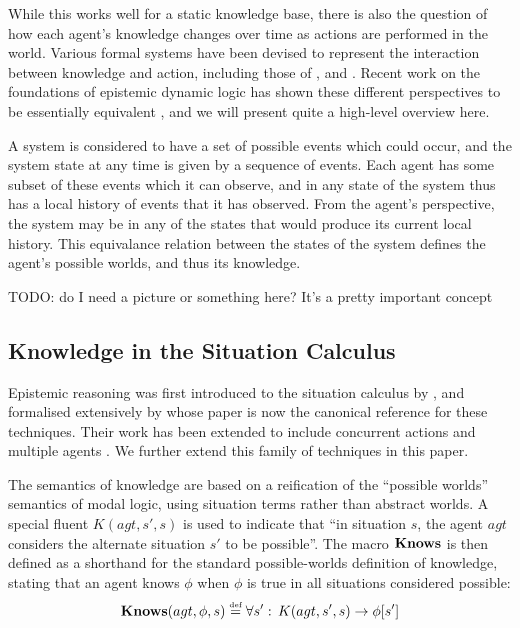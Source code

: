 While this works well for a static knowledge base, there is also the
question of how each agent's knowledge changes over time as actions
are performed in the world. Various formal systems have been devised
to represent the interaction between knowledge and action, including
those of \citet{fagin95}, \citet{parikh85dist_knowledge} and \citet{baltag98pa_ck}.
Recent work on the foundations of epistemic dynamic logic has shown
these different perspectives to be essentially equivalent \citep{vanBentham06tree_of_knowledge,pacuit07history_structures},
and we will present quite a high-level overview here.

A system is considered to have a set of possible events which could
occur, and the system state at any time is given by a sequence of
events. Each agent has some subset of these events which it can observe,
and in any state of the system thus has a local history of events
that it has observed. From the agent's perspective, the system may
be in any of the states that would produce its current local history.
This equivalance relation between the states of the system defines
the agent's possible worlds, and thus its knowledge.

TODO: do I need a picture or something here? It's a pretty important
concept


\subsection{Knowledge in the Situation Calculus}

Epistemic reasoning was first introduced to the situation calculus
by \citet{moore80know_act}, and formalised extensively by \citet{scherl03sc_knowledge}
whose paper is now the canonical reference for these techniques. Their
work has been extended to include concurrent actions \citep{scherl03conc_knowledge}
and multiple agents \citep{shapiro98specifying_ma_systems}. We further
extend this family of techniques in this paper.

The semantics of knowledge are based on a reification of the {}``possible
worlds'' semantics of modal logic, using situation terms rather than
abstract worlds. A special fluent $K(agt,s',s)$ is used to indicate
that {}``in situation $s$, the agent $agt$ considers the alternate
situation $s'$ to be possible''. The macro $\mathbf{Knows}$ is then defined
as a shorthand for the standard possible-worlds definition of knowledge,
stating that an agent knows $\phi$ when $\phi$ is true in all situations
considered possible: \begin{equation}
\mathbf{Knows}(agt,\phi,s)\stackrel{\mbox{\tiny def}}{=}\forall s':\, K(agt,s',s)\rightarrow\phi[s']\label{eqn:Background:knows_def}\end{equation}


